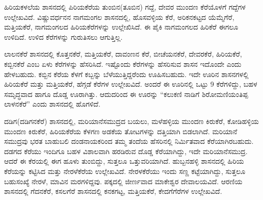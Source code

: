 ಹಿರಿಯಕಳಲೆಯ ಶಾಸನದಲ್ಲಿ ಪಿರಿಯಕೆರೆಯ ತುಂಬಿನ(ತೂಬಿನ) ಗದ್ದೆ, ದೇವರ ಮುಂದಣ ಕೆರೆಯೊಳಗೆ ಗದ್ದೆಗಳ ಉಲ್ಲೇಖವಿದೆ. ವಿಷ್ಣುವರ್ಧನನ ನಾಗಮಂಗಲ ಶಾಸನದಲ್ಲಿ, ಹೊಸವಳ್ಳಿಯ ಕೆರೆ, ಅರಿಕನಕಟ್ಟದ ಯೆಮ್ಮೆಗೆರೆ, ಮತ್ತಿಯಕೆರೆ, ನಾಗಮಂಗಲದ ಹಿರಿಯಕೆರೆಗಳನ್ನು ಉಲ್ಲೇಖಿಸಿದೆ. ಈ ಪೈಕಿ ನಾಗಮಂಗಲದ ಹಿರಿಕೆರೆ ಈಗಲೂ ಉಳಿದಿದೆ. ಉಳಿದ ಕೆರೆಗಳನ್ನು ಗುರುತಿಸಲು ಆಗುತ್ತಿಲ್ಲ.

ಲಾಲನಕೆರೆ ಶಾಸನದಲ್ಲಿ ಕೊತ್ತನಕೆರೆ, ಮತ್ತಿಯಕೆರೆ, ದಾವಂಣನ ಕೆರೆ, ಬೀಚೆಯನಕೆರೆ, ದೇವರಕೆರೆ, ಹಿರಿಯಕೆರೆ, ಕಬ್ಬಿನಕೆರೆ ಎಂಬ ಏಳು ಕೆರೆಗಳನ್ನು ಹೆಸರಿಸಿದೆ. ಇಷ್ಟೊಂದು ಕೆರೆಗಳನ್ನು ಹೆಸರಿಸುವ ಶಾಸನ ಇದೊಂದೇ ಎಂದು ಹೇಳಬಹುದು. ಕಬ್ಬಿನ ಕೆರೆಯ ಕೆಳಗೆ ಕಬ್ಬನ್ನು ಬೆಳೆಯುತ್ತಿದ್ದರೆಂದು ಊಹಿಸಬಹುದು. ಇದೇ ಊರಿನ ಶಾಸನಗಳಲ್ಲಿ ಹಿರಿಯಕೆರೆ ಮತ್ತು ಮತ್ತಿಯಕೆರೆ, ಹೆಗ್ಗಡೆ ಕೆರೆಗಳ ಉಲ್ಲೇಖವಿದೆ. ಅಂದರೆ ಈ ಊರಿನಲ್ಲಿ ಒಟ್ಟು 9 ಕೆರೆಗಳಿದ್ದು, ಬಹಳ ಸಮೃದ್ಧವಾದ ಹಾಗೂ ದೊಡ್ಡ ಊರಾಗಿತ್ತು. ಆದುದರಿಂದ ಈ ಊರನ್ನು “ಕಲುಕಣಿ ನಾಡಿಗೆ ಶಿರೋಮಣಿಯಂತಿಪ್ಪ ಲಾಳನಕೆರೆ” ಎಂದು ಶಾಸನದಲ್ಲಿ ಹೊಗಳಿದೆ.

ದಡಿಗ(ದಡಿಗನಕೆರೆ) ಶಾಸನದಲ್ಲಿ, ಮರಿಯಾನೆಸಮುದ್ರದ ಬಯಲು, ಮಳೆಹಳ್ಳಿಯ ಮುಂದಣ ಕಿರುಕೆರೆ, ಕೋಡಿಹಳ್ಳಿಯ ಮುಂದಣ ಕಿರುಕೆರೆ, ಹಿರಿಯಕೆರೆಯ ಕೆಳಗಣ ಅಡಕೆಯ ತೋಟಗಳನ್ನು ದತ್ತಿಯಾಗಿ ಬಿಡಲಾಗಿದೆ. ಮರಿಯಾನೆ ಸಮುದ್ರವು ಭರತ ಬಾಹುಬಲಿ ದಂಡನಾಯಕರಿಂದ ತಮ್ಮ ತಂದೆಯ ಹೆಸರಿನಲ್ಲಿ ನಿರ್ಮಿತವಾದ ಕೆರೆಯಾಗಿರಬಹುದು. ದಡಗದ ಕೆರೆಯು ಇಂದಿಗೂ ಬಹಳ ವಿಶಾಲವಾಗಿ ಹರಡಿರುವ ದೊಡ್ಡ ಕೆರೆಯಾಗಿದ್ದು, ಇದೇ ಮರಿಯಾನೆಸಮುದ್ರ. ಆದರೆ ಈ ಕೆರಯಲ್ಲಿ ಈಗ ಹೂಳು ತುಂಬಿದ್ದು, ಸುತ್ತಲೂ ಒತ್ತುವರಿಯಾಗಿದೆ. ಹುಬ್ಬನಹಳ್ಳಿ ಶಾಸನದಲ್ಲಿ ಹಿರಿಯ ಕೆರೆಯನ್ನು ಕಟ್ಟಿಸಿದ ಮತ್ತು ನೇರಳೆಕೆರೆಯ ಉಲ್ಲೇಖವಿದೆ. ನೇರಳಕೆರೆಯು ಇಂದು ಸಣ್ಣ ಕಟ್ಟೆಯಾಗಿದ್ದು, ಸುತ್ತಲೂ ಬಹುಸಂಖ್ಯೆ ನೇರಳೆ, ಮಾವಿನ ಮರಗಳಿದ್ದವು. ಪಕ್ಕದಲ್ಲಿ ಜೀರ್ಣವಾದ ಮಾಕೇಶ್ವರ ದೇವಾಲಯವಿದೆ.  ಆರಣಿಯ ಶಾಸನದಲ್ಲಿ ಗೆದನಕೆರೆ, ಕಸಲಗೆರೆ ಶಾಸನದಲ್ಲಿ ಕನಕಗಟ್ಟ, ಮತ್ತಿಯಕೆರೆ, ಕೇದಗೆಗೆರೆಗಳ ಉಲ್ಲೇಖವಿದೆ.

